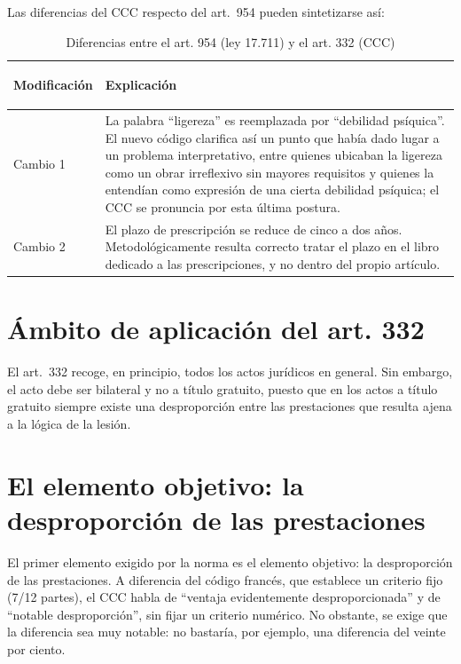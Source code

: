 \documentclass[12pt,oneside]{book}
\begin{document}
Las diferencias del CCC respecto del art.\ 954 pueden sintetizarse así:

\begin{table}[H]
\centering
\caption{Diferencias entre el art. 954 (ley 17.711) y el art. 332 (CCC)}
\begin{tabularx}{\textwidth}{>{\bfseries\raggedright\arraybackslash}p{} X}
\toprule
\textbf{Modificación} & \textbf{Explicación} \\
\midrule
Cambio 1 & La palabra ``ligereza'' es reemplazada por ``debilidad psíquica''. El nuevo código clarifica así un punto que había dado lugar a un problema interpretativo, entre quienes ubicaban la ligereza como un obrar irreflexivo sin mayores requisitos y quienes la entendían como expresión de una cierta debilidad psíquica; el CCC se pronuncia por esta última postura. \\
Cambio 2 & El plazo de prescripción se reduce de cinco a dos años. Metodológicamente resulta correcto tratar el plazo en el libro dedicado a las prescripciones, y no dentro del propio artículo. \\
\bottomrule
\end{tabularx}
\end{table}

\section{Ámbito de aplicación del art. 332}

El art.\ 332 recoge, en principio, todos los actos jurídicos en general. Sin embargo, el acto debe ser bilateral y no a título gratuito, puesto que en los actos a título gratuito siempre existe una desproporción entre las prestaciones que resulta ajena a la lógica de la lesión.

\section{El elemento objetivo: la desproporción de las prestaciones}

El primer elemento exigido por la norma es el elemento objetivo: la desproporción de las prestaciones. A diferencia del código francés, que establece un criterio fijo (7/12 partes), el CCC habla de ``ventaja evidentemente desproporcionada'' y de ``notable desproporción'', sin fijar un criterio numérico. No obstante, se exige que la diferencia sea muy notable: no bastaría, por ejemplo, una diferencia del veinte por ciento.
\end{document}
